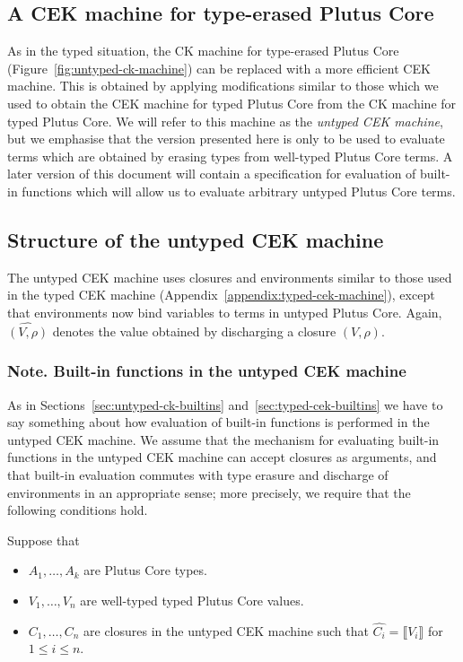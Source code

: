 \documentclass[a4paper]{article}
\newcommand\discharge[1]{\widehat{#1}}
\newcommand{\erase}[1]{\llbracket#1\rrbracket}
\begin{document}
\begin{appendices}
\section{A CEK machine for type-erased Plutus Core}
\label{appendix:untyped-cek-machine}
As in the typed situation, the CK machine for type-erased Plutus Core
(Figure~\ref{fig:untyped-ck-machine}) can be replaced with a more
efficient CEK machine.  This is obtained by applying modifications
similar to those which we used to obtain the CEK machine for typed
Plutus Core from the CK machine for typed Plutus Core.  We will refer
to this machine as the \textit{untyped CEK machine}, but we emphasise
that the version presented here is only to be used to evaluate terms
which are obtained by erasing types from well-typed Plutus Core terms.
A later version of this document will contain a specification for
evaluation of built-in functions which will allow us to evaluate
arbitrary untyped Plutus Core terms.

\subsection{Structure of the untyped CEK machine}
The untyped CEK machine uses closures and environments similar to
those used in the typed CEK machine
(Appendix~\ref{appendix:typed-cek-machine}), except that environments now
bind variables to terms in untyped Plutus Core.  Again,
$\discharge{(V,\rho)}$ denotes the value obtained by discharging a
closure $(V,\rho)$.



\subsubsection{Note. Built-in functions in the untyped CEK machine}
\label{sec:untyped-cek-builtins}
As in Sections~\ref{sec:untyped-ck-builtins}
and~\ref{sec:typed-cek-builtins} we have to say something about how
evaluation of built-in functions is performed in the untyped CEK
machine. We assume that the mechanism for evaluating built-in
functions in the untyped CEK machine can accept closures as arguments,
and that built-in evaluation commutes with type erasure and discharge
of environments in an appropriate sense; more precisely, we require
that the following conditions hold.

\medskip
\noindent Suppose that
\begin{itemize}
\item $A_1, \ldots, A_k$ are Plutus Core types.
\item $V_1, \ldots, V_n$ are well-typed typed Plutus Core values.
\item $C_1, \ldots, C_n$ are closures in the untyped
CEK machine such that $\discharge{C_i} = \erase{V_i} $ for
$1 \le i \le n$.
\end{itemize}


\end{appendices}
\end{document}
